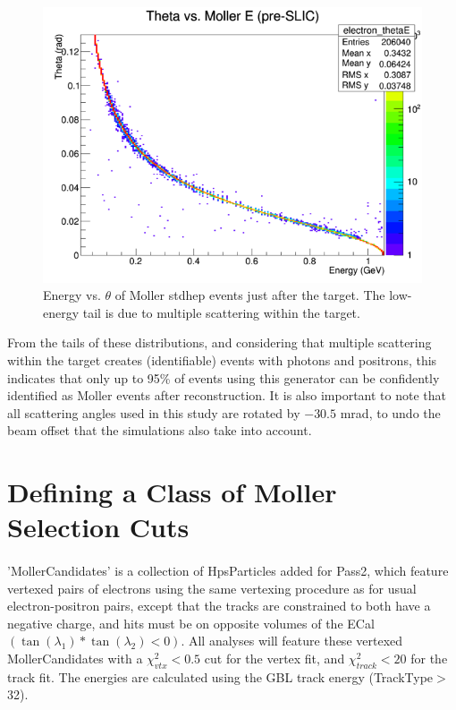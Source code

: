 \documentclass{article}
\begin{document}
	\begin{figure}[H]
  	\includegraphics[width=\linewidth]{old/stdET.png}
  	\caption{Energy vs. $\theta$ of Moller stdhep events just after the target. The low-energy tail is due to multiple scattering within the target.}
  	\label{fig:stdET}
	\end{figure}

	From the tails of these distributions, and considering that multiple scattering within the target creates (identifiable) events with photons and positrons, this indicates that only up to 95\% of events using this generator can be confidently identified as Moller events after reconstruction. It is also important to note that all scattering angles used in this study are rotated by $-30.5$ mrad, to undo the beam offset that the simulations also take into account.

	\section{Defining a Class of Moller Selection Cuts}
	\paragraph{}
	'MollerCandidates' is a collection of HpsParticles added for Pass2, which feature vertexed pairs of electrons using the same vertexing procedure as for usual electron-positron pairs, except that the tracks are constrained to both have a negative charge, and hits must be on opposite volumes of the ECal $\left(\tan{\left(\lambda_1\right)}*\tan{\left(\lambda_2\right)}<0\right)$. All analyses will feature these vertexed MollerCandidates with a $\chi^{2}_{vtx}<0.5$ cut for the vertex fit, and $\chi^{2}_{track}<20$ for the track fit. The energies are calculated using the GBL track energy (TrackType$>$32).
\end{document}
